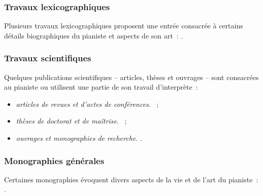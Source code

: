 \subsubsection{Travaux lexicographiques}

Plusieurs travaux lexicographiques proposent une entrée consacrée à certains
détails biographiques du pianiste et aspects de son art~: \citet{Baker,
Bellamy, Fanning01, Gurlitt, Gut, Lago, Lompech12, Milshteyn81, Paris,
Roesner, Schonberg63, Seidle, Vignal, Villemin, Wilson, Zemtsovsky,
Zilberquit}.

\subsubsection{Travaux scientifiques}

Quelques publications scientifiques -- articles, thèses et ouvrages -- sont
consacrées au pianiste ou utilisent une partie de son travail d'interprète~:
\begin{itemize}
 \item\emph{articles de revues et d'actes de conférences}.
 \citet{Brilliantova20, Girardi, Gupalo21, Komarovskikh12a, Komarovskikh12b,
 Komarovskikh13a, Komarovskikh13b, Komarovskikh14a, Komarovskikh14b,
 Komarovskikh14c, Ljalina06, Lobanov10, Lourenco07, Lourenco10, Manyakine,
 Marquez15, Merkoulov16, Mustafaieva, Purwins, Zimogljad18}~;
 \item\emph{thèses de doctorat et de maîtrise}.
 \citet{Artese, Barolsky, Chiang, Chiao, Chkourak10, Combrink92, Cotta,
 Dejos, Karpeyev14, Komarovskikh18, Kounadi, Kurmankulov, Lajko, Lourenco05,
 Magalotti, Mehmetli, Navickaite, Ohriner, Orlovsky91, Razumovskaya14, Rego,
 Sukhina, White, Zaborowski}~;
 \item\emph{ouvrages et monographies de recherche}.
 \citet{Alekseiev93, Delson70, Gakkel95, Orlovsky14, Rabinovich70,
 Rybakova06}.
\end{itemize}

\subsubsection{Monographies générales}

Certaines monographies évoquent divers aspects de la vie et de l'art du
pianiste~: \citet{Alekseiev88, Ballard, Berman03, Chernikov, Ciammarughi,
Dubal84, Dubal05, Kehler, Khentova64, Lapin, Leikin, Letourneur18,
Monsaingeon, Paperno03, Rabinovich79, Rattalino83, Rattalino90, Scriabina,
Silverman, Volkov79, Volkov97}.

